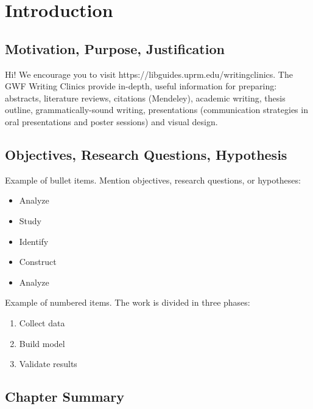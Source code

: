 

\chapter{Introduction}  
\section{Motivation, Purpose, Justification}

\noindent Hi! We encourage you to visit https://libguides.uprm.edu/writingclinics. The GWF Writing Clinics provide in-depth, useful information for preparing: abstracts, literature reviews, citations (Mendeley), academic writing, thesis outline, grammatically-sound writing, presentations (communication strategies in oral presentations and poster sessions) and visual design.  %

\section{Objectives, Research Questions, Hypothesis}


\noindent Example of bullet items. Mention objectives, research questions, or hypotheses:
\begin{itemize}
\item Analyze
\item Study 
\item Identify
\item Construct
\item Analyze 
\end{itemize}
	
\noindent Example of numbered items. The work is divided in three phases: 

\begin{enumerate}
\item Collect data
\item Build model
\item Validate results
\end{enumerate} 


\section{Chapter Summary}

